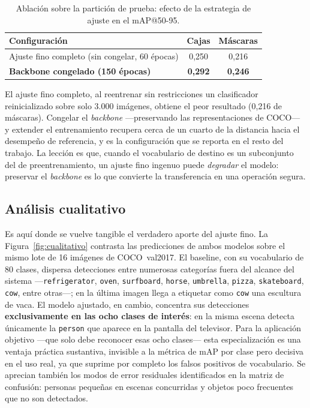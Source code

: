 \documentclass[11pt,a4paper]{article}
\begin{document}
\begin{table}[H]
  \centering
  \small
  \caption{Ablación sobre la partición de prueba: efecto de la estrategia de
  ajuste en el mAP@50-95.}
  \label{tab:ablacion}
  \begin{tabular}{@{}lcc@{}}
    \toprule
    \textbf{Configuración} & \textbf{Cajas} & \textbf{Máscaras} \\
    \midrule
    Ajuste fino completo (sin congelar, 60 épocas) & 0,250 & 0,216 \\
    \textbf{Backbone congelado (150 épocas)} & \textbf{0,292} & \textbf{0,246} \\
    \bottomrule
  \end{tabular}
\end{table}

El ajuste fino completo, al reentrenar sin restricciones un clasificador
reinicializado sobre solo 3.000 imágenes, obtiene el peor resultado (0,216 de
máscaras). Congelar el \emph{backbone} ---preservando las representaciones de
COCO--- y extender el entrenamiento recupera cerca de un cuarto de la distancia
hacia el desempeño de referencia, y es la configuración que se reporta en el
resto del trabajo. La lección es que, cuando el vocabulario de destino es un
subconjunto del de preentrenamiento, un ajuste fino ingenuo puede \emph{degradar}
el modelo: preservar el \emph{backbone} es lo que convierte la transferencia en
una operación segura.

\subsection{Análisis cualitativo}
\label{sec:cualitativo}

Es aquí donde se vuelve tangible el verdadero aporte del ajuste fino. La
Figura~\ref{fig:cualitativo} contrasta las predicciones de ambos modelos sobre
el mismo lote de 16 imágenes de COCO~val2017. El baseline, con su vocabulario de
80 clases, dispersa detecciones entre numerosas categorías fuera del alcance del
sistema ---\texttt{refrigerator}, \texttt{oven}, \texttt{surfboard},
\texttt{horse}, \texttt{umbrella}, \texttt{pizza}, \texttt{skateboard},
\texttt{cow}, entre otras---; en la última imagen llega a etiquetar como
\texttt{cow} una escultura de vaca. El modelo ajustado, en cambio, concentra sus
detecciones \textbf{exclusivamente en las ocho clases de interés}: en la misma
escena detecta únicamente la \texttt{person} que aparece en la pantalla del
televisor. Para la aplicación objetivo ---que solo debe reconocer esas ocho
clases--- esta especialización es una ventaja práctica sustantiva, invisible a
la métrica de mAP por clase pero decisiva en el uso real, ya que suprime por
completo los falsos positivos de vocabulario. Se aprecian también los modos de
error residuales identificados en la matriz de confusión: personas pequeñas en
escenas concurridas y objetos poco frecuentes que no son detectados.
\end{document}
